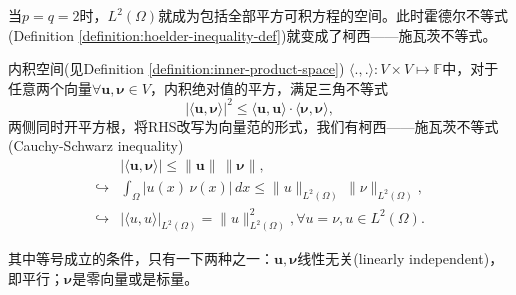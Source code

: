 当$p=q=2$时，$L^2(\Omega)$就成为包括全部平方可积方程的空间。此时霍德尔不等式(Definition \ref{definition:hoelder-inequality-def})就变成了柯西——施瓦茨不等式。
\begin{definition}[柯西——施瓦茨不等式]
  \label{definition:cauchy-schwarz-inequality}
  内积空间(见Definition \ref{definition:inner-product-space}) $\langle .,. \rangle : V \times V \mapsto \mathbb{F}$中，对于任意两个向量$\forall \bm{u}, \bm{\nu} \in V$，内积绝对值的平方，满足三角不等式
  \begin{equation*}
    \big| \langle \bm{u},\bm{\nu} \rangle \big|^2 \le \langle \bm{u},\bm{u} \rangle \cdot \langle \bm{\nu},\bm{\nu} \rangle,
  \end{equation*}
  两侧同时开平方根，将RHS改写为向量范的形式，我们有柯西——施瓦茨不等式(Cauchy-Schwarz inequality)
  \begin{equation*}
\begin{split}
      &\big| \langle \bm{u},\bm{\nu} \rangle \big| \le \| \bm{u} \| \, \| \bm{\nu} \|,\\
      \hookrightarrow & \int_{\Omega} \left| u(x) \, \nu(x) \right| \, d x \le \| u \|_{L^2(\Omega)} \, \| \nu \|_{L^2(\Omega)},\\
      \hookrightarrow & \big| \langle u, u \rangle \big|_{L^2(\Omega)} = \| u \|^2_{L^2(\Omega)}, \forall u=\nu, u \in L^2(\Omega).
\end{split}
  \end{equation*}

  其中等号成立的条件，只有一下两种之一：$\bm{u},\bm{\nu}$线性无关(linearly independent)，即平行；$\bm{\nu}$是零向量或是标量。
\end{definition}
